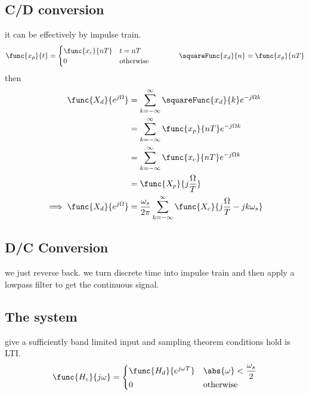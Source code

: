 \subsection*{C/D conversion}
it can be effectively by impulse train.
\begin{equation*}
    \func{x_p}{t} = \begin{cases}
        \func{x_c}{nT} & t = nT\\
        0 & \text{otherwise}
    \end{cases} \qquad \qquad \squareFunc{x_d}{n} = \func{x_p}{nT}
\end{equation*}
then 
\begin{align*}
    \func{X_d}{e^{j\Omega}} &= \sum_{k = -\infty}^{\infty} \squareFunc{x_d}{k} e^{-j\Omega k} \\ 
    &= \sum_{k = -\infty}^{\infty} \func{x_p}{nT} e^{-j\Omega k} \\
    &= \sum_{k = -\infty}^{\infty} \func{x_c}{nT} e^{-j\Omega k} \\
    &= \func{X_p}{j\dfrac{\Omega}{T}} \\
    \implies \func{X_d}{e^{j\Omega}} &= \dfrac{\omega_s}{2\pi}   \sum_{k = -\infty}^{\infty} \func{X_c}{j\frac{\Omega}{T} - jk\omega_s}
\end{align*}

\subsection*{D/C Conversion}
we just reverse back. we turn discrete time into impulse train and then apply a lowpass filter to get the continuous signal.

\subsection*{The system}
give a sufficiently band limited input and sampling theorem conditions hold is LTI.
\begin{equation*}
    \func{H_c}{j\omega} = \begin{cases}
        \func{H_d}{e^{j\omega T}} & \abs{\omega} < \dfrac{\omega_s}{2}\\
        0 &\text{otherwise}
    \end{cases}
\end{equation*}

